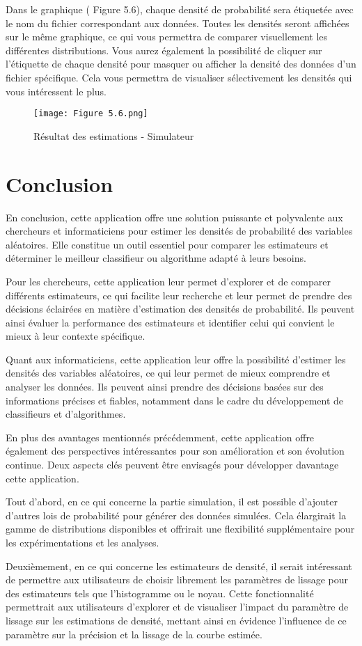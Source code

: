 Dans le graphique ( Figure 5.6), chaque densité de probabilité sera étiquetée avec le nom du fichier correspondant aux données. Toutes les densités seront affichées sur le même graphique, ce qui vous permettra de comparer visuellement les différentes distributions. Vous aurez également la possibilité de cliquer sur l'étiquette de chaque densité pour masquer ou afficher la densité des données d'un fichier spécifique. Cela vous permettra de visualiser sélectivement les densités qui vous intéressent le plus. \\
\begin{figure}[!h]
  \centering
  \texttt{[image: Figure 5.6.png]}
  \caption{Résultat des estimations - Simulateur}
  \label{fig:Architecture de l'application}
\end{figure}
\newpage
\section{Conclusion}
En conclusion, cette application offre une solution puissante et polyvalente aux chercheurs et informaticiens pour estimer les densités de probabilité des variables aléatoires. Elle constitue un outil essentiel pour comparer les estimateurs et déterminer le meilleur classifieur ou algorithme adapté à leurs besoins.

Pour les chercheurs, cette application leur permet d'explorer et de comparer différents estimateurs, ce qui facilite leur recherche et leur permet de prendre des décisions éclairées en matière d'estimation des densités de probabilité. Ils peuvent ainsi évaluer la performance des estimateurs et identifier celui qui convient le mieux à leur contexte spécifique.

Quant aux informaticiens, cette application leur offre la possibilité d'estimer les densités des variables aléatoires, ce qui leur permet de mieux comprendre et analyser les données. Ils peuvent ainsi prendre des décisions basées sur des informations précises et fiables, notamment dans le cadre du développement de classifieurs et d'algorithmes.

En plus des avantages mentionnés précédemment, cette application offre également des perspectives intéressantes pour son amélioration et son évolution continue. Deux aspects clés peuvent être envisagés pour développer davantage cette application.

Tout d'abord, en ce qui concerne la partie simulation, il est possible d'ajouter d'autres lois de probabilité pour générer des données simulées. Cela élargirait la gamme de distributions disponibles et offrirait une flexibilité supplémentaire pour les expérimentations et les analyses.

Deuxièmement, en ce qui concerne les estimateurs de densité, il serait intéressant de permettre aux utilisateurs de choisir librement les paramètres de lissage pour des estimateurs tels que l'histogramme ou le noyau. Cette fonctionnalité permettrait aux utilisateurs d'explorer et de visualiser l'impact du paramètre de lissage sur les estimations de densité, mettant ainsi en évidence l'influence de ce paramètre sur la précision et la lissage de la courbe estimée.
